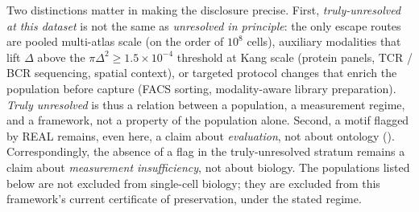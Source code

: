 Two distinctions matter in making the disclosure precise. First, \textit{truly-unresolved at this dataset} is not the same as \textit{unresolved in principle}: the only escape routes are pooled multi-atlas scale (on the order of $10^{8}$ cells), auxiliary modalities that lift $\Delta$ above the $\pi \Delta^{2} \geq 1.5 \times 10^{-4}$ threshold at Kang scale (protein panels, TCR / BCR sequencing, spatial context), or targeted protocol changes that enrich the population before capture (FACS sorting, modality-aware library preparation). \textit{Truly unresolved} is thus a relation between a population, a measurement regime, and a framework, not a property of the population alone. Second, a motif flagged by \textsc{REAL} remains, even here, a claim about \emph{evaluation}, not about ontology (). Correspondingly, the absence of a flag in the truly-unresolved stratum remains a claim about \emph{measurement insufficiency}, not about biology. The populations listed below are not excluded from single-cell biology; they are excluded from this framework's current certificate of preservation, under the stated regime.
